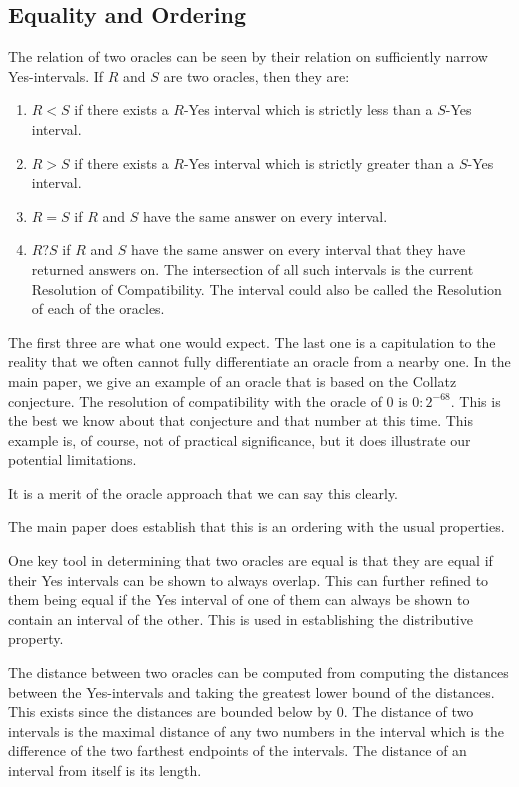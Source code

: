 \documentclass[12pt]{article}
\theoremstyle{remark}
\begin{document}
\subsection{Equality and Ordering}

The relation of two oracles can be seen by their relation on sufficiently narrow Yes-intervals. If $R$ and $S$ are two oracles, then they are:
\begin{enumerate}
\item $R<S$ if there exists a $R$-Yes interval which is strictly less than a $S$-Yes interval.
\item $R>S$ if there exists a $R$-Yes interval which is strictly greater than a $S$-Yes interval.
\item $R=S$ if $R$ and $S$ have the same answer on every interval.
\item $R?S$ if $R$ and $S$ have the same answer on every interval that they have returned answers on. The intersection of all such intervals is the current Resolution of Compatibility. The interval could also be called the Resolution of each of the oracles. 
\end{enumerate}

The first three are what one would expect. The last one is a capitulation to the reality that we often cannot fully differentiate an oracle from a nearby one. In the main paper, we give an example of an oracle that is based on the Collatz conjecture. The resolution of compatibility with the oracle of 0 
 is $0:2^{-68}$. This is the best we know about that conjecture and that number at this time. This example is, of course, not of practical significance, but it does illustrate our potential limitations. 

 It is a merit of the oracle approach that we can say this clearly. 

The main paper does establish that this is an ordering with the usual properties. 

One key tool in determining that two oracles are equal is that they are equal if their Yes intervals can be shown to always overlap. This can further refined to them being equal if the Yes interval of one of them can always be shown to contain an interval of the other. This is used in establishing the distributive property. 

The distance between two oracles can be computed from computing the distances between the Yes-intervals and taking the greatest lower bound of the distances. This exists since the distances are bounded below by 0. The distance of two intervals is the maximal distance of any two numbers in the interval which is the difference of the two farthest endpoints of the intervals. The distance of an interval from itself is its length. 
\end{document}
